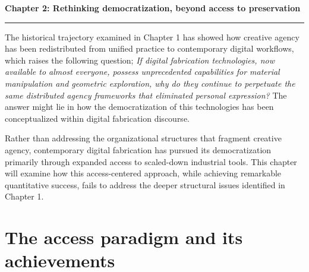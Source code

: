 \clearpage

\setcounter{chapter}{2}
\setcounter{section}{0}


\pagestyle{fancy}
\fancyhf{}
\fancyfoot[C]{\thepage}
\renewcommand{\headrulewidth}{0pt}
\renewcommand{\footrulewidth}{0pt}

\noindent
{\Large\textbf{Chapter 2: Rethinking democratization, beyond access to preservation}}
\vspace{0.3cm}
\hrule
\vspace{0.8cm}
\label{ch:democratization}

\setlength{\parindent}{0pt}

The historical trajectory examined in Chapter 1 has showed how creative agency has been redistributed from unified practice to contemporary digital workflows, which raises the following question; \textit{If digital fabrication technologies, now available to almost everyone, possess unprecedented capabilities for material manipulation and geometric exploration, why do they continue to perpetuate the same distributed agency frameworks that eliminated personal expression?} The answer might lie in how the democratization of this technologies has been conceptualized within digital fabrication discourse.

\vspace{0.5cm}

Rather than addressing the organizational structures that fragment creative agency, contemporary digital fabrication has pursued its democratization primarily through expanded access to scaled-down industrial tools. This chapter will examine how this access-centered approach, while achieving remarkable quantitative success, fails to address the deeper structural issues identified in Chapter 1.

\section{The access paradigm and its achievements}

